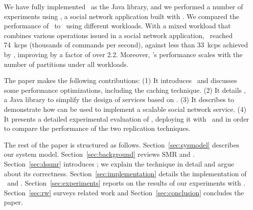 We have fully implemented \dssmr\ as the \libname{} Java library, and we performed a number of experiments using \appname{}, a social network application built with \libname{}.
We compared the performance of \dssmr\ to \ssmr\ using different workloads.
With a mixed workload that combines various operations issued in a social network application, \dssmr\ reached 74~kcps (thousands of commands per second), against less than 33~kcps achieved by \ssmr{}, improving by a factor of over 2.2.
Moreover, \dssmr's performance scales with the number of partitions under all workloads.

The paper makes the following contributions:
(1) It introduces \dssmr\ and discusses some performance optimizations, including the caching technique. 
(2) It details \libname{}, a Java library to simplify the design of services based on \dssmr{}.
(3) It describes \appname{} to demonstrate how \libname{} can be used to implement a scalable social network service.
(4) It presents a detailed experimental evaluation of \appname{}, deploying it with \ssmr\ and \dssmr{} in order to compare the performance of the two replication techniques.

The rest of the paper is structured as follows.
Section~\ref{sec:sysmodel} describes our system model.
Section~\ref{sec:background} reviews SMR and \ssmrshort{}.
Section~\ref{sec:dssmr} introduces \dssmr{}; we explain the technique in detail and argue about its correctness.
Section~\ref{sec:implementation} details the implementation of \libname\ and \appname{}.
Section~\ref{sec:experiments} reports on the results of our experiments with \dssmr{}.
Section~\ref{sec:rw} surveys related work and
Section~\ref{sec:conclusion} concludes the paper.


